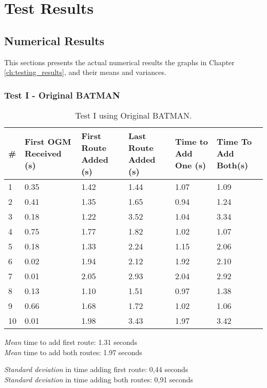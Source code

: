 \chapter{Test Results}
\label{appendix:test_results}
\acresetall
\section{Numerical Results}
This sections presents the actual numerical results the graphs in Chapter
\ref{ch:testing_results}, and their means and variances.

\subsection{Test I - Original BATMAN}
\begin{table}[h!]
	\centering
	\begin{tabular}{| l || p{24mm} || p{22mm} | p{22mm} || p{20mm} |  p{20mm} |}\hline
 		\textbf{\#} & \textbf{First OGM Received (s)} & \textbf{First Route Added (s)} & \textbf{Last Route Added (s)} & \textbf{Time to Add One (s)} & \textbf{Time To Add Both(s)}\\\hline
 		 1 & 0.35 & 1.42 & 1.44 & 1.07 & 1.09\\\hline
 		 2 & 0.41 & 1.35 & 1.65 & 0.94 & 1.24\\\hline
 		 3 & 0.18 & 1.22 & 3.52 & 1.04 & 3.34\\\hline
 		 4 & 0.75 & 1.77 & 1.82 & 1.02 & 1.07\\\hline
 		 5 & 0.18 & 1.33 & 2.24 & 1.15 & 2.06\\\hline
 		 6 & 0.02 & 1.94 & 2.12 & 1.92 & 2.10\\\hline
 		 7 & 0.01 & 2.05 & 2.93 & 2.04 & 2.92\\\hline
 		 8 & 0.13 & 1.10 & 1.51 & 0.97 & 1.38\\\hline
 		 9 & 0.66 & 1.68 & 1.72 & 1.02 & 1.06\\\hline
 		10 & 0.01 & 1.98 & 3.43 & 1.97 & 3.42\\\hline  
	\end{tabular}
	\caption{Test I using Original BATMAN.}
	\label{tab:test1_original}
\end{table}

\emph{Mean} time to add first route: 1.31 seconds\\
\emph{Mean} time to add both routes: 1.97 seconds

\emph{Standard deviation} in time adding first route: 0,44 seconds\\
\emph{Standard deviation} in time adding both routes: 0,91 seconds

